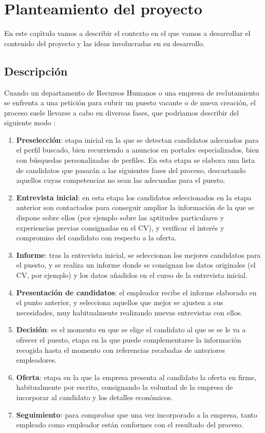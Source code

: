 
\chapter{Planteamiento del proyecto}

En este cap\'\i tulo vamos a describir el contexto en el que vamos a desarrollar el contenido del 
proyecto y las ideas involucradas en su desarrollo.

\section{Descripci\'on}
Cuando un departamento de Recursos Humanos o una empresa de reclutamiento se enfrenta a una petici\'on para
cubrir un puesto vacante o de nueva creaci\'on, el proceso suele llevarse a cabo en diversas fases, que 
podr\'\i amos describir del siguiente modo \cite{proceso_seleccion1}:
\begin{enumerate}
\item {\bf Preselección}: etapa inicial en la que se detectan candidatos adecuados para el perfil buscado, bien recurriendo a 
anuncios en portales especializados, bien con b\'usquedas personalizadas de perfiles. En esta etapa se elabora una lista 
de candidatos que pasar\'an a las siguientes fases del proceso, descartando aquellos cuyas competencias no sean las adecuadas
para el puesto. 
\item {\bf Entrevista inicial}: en esta etapa los candidatos seleccionados en la etapa anterior son contactados para  
conseguir ampliar la informaci\'on de la que se dispone sobre ellos  (por ejemplo sobre las aptitudes
particulares y experiencias previas consignadas en el CV), y verificar el inter\'es y compromiso del candidato
con respecto a la oferta.
\item {\bf Informe}: tras la entrevista inicial, se seleccionan los mejores candidatos para el puesto, y se realiza un informe
donde se consignan los datos originales (el CV, por ejemplo) y los datos a\~nadidos en el curso de la entrevista inicial.
\item {\bf Presentaci\'on de candidatos}: el empleador recibe el informe elaborado en el punto anterior, y selecciona aquellos
que mejor se ajusten a sus necesidades, muy habitualmente realizando nuevas entrevistas con ellos.
\item {\bf Decisi\'on}: es el momento en que se elige el candidato al que se se le va a ofrecer el puesto, etapa en la 
que puede complementarse la informaci\'on recogida hasta el momento con referencias recabadas de anteriores empleadores.
\item {\bf Oferta}: etapa en la que la empresa presenta al candidato la oferta en firme, habitualmente por escrito, consignando 
la voluntad de la empresa de incorporar al candidato y los detalles econ\'omicos. 
\item {\bf Seguimiento}:  para comprobar que una vez incorporado a la empresa, tanto empleado como empleador est\'an conformes con
el resultado del proceso.
\end{enumerate}


